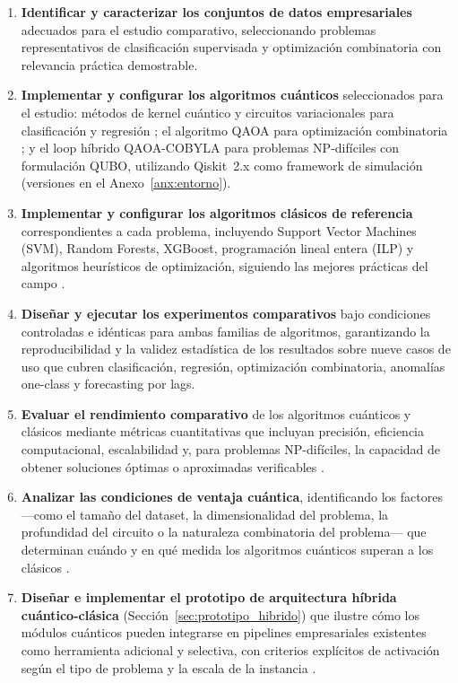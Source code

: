 \begin{enumerate}
    \item \textbf{Identificar y caracterizar los conjuntos de datos empresariales} adecuados para el estudio comparativo, seleccionando problemas representativos de clasificación supervisada y optimización combinatoria con relevancia práctica demostrable.

    \item \textbf{Implementar y configurar los algoritmos cuánticos} seleccionados para el estudio: métodos de kernel cuántico y circuitos variacionales para clasificación y regresión \citep{schuld2021, huang2021}; el algoritmo QAOA para optimización combinatoria \citep{farhi2014}; y el loop híbrido QAOA-COBYLA para problemas NP-difíciles con formulación QUBO, utilizando Qiskit~2.x como framework de simulación (versiones en el Anexo~\ref{anx:entorno}).

    \item \textbf{Implementar y configurar los algoritmos clásicos de referencia} correspondientes a cada problema, incluyendo Support Vector Machines (SVM), Random Forests, XGBoost, programación lineal entera (ILP) y algoritmos heurísticos de optimización, siguiendo las mejores prácticas del campo \citep{jordan2015}.

    \item \textbf{Diseñar y ejecutar los experimentos comparativos} bajo condiciones controladas e idénticas para ambas familias de algoritmos, garantizando la reproducibilidad y la validez estadística de los resultados sobre nueve casos de uso que cubren clasificación, regresión, optimización combinatoria, anomalías one-class y forecasting por lags.

    \item \textbf{Evaluar el rendimiento comparativo} de los algoritmos cuánticos y clásicos mediante métricas cuantitativas que incluyan precisión, eficiencia computacional, escalabilidad y, para problemas NP-difíciles, la capacidad de obtener soluciones óptimas o aproximadas verificables \citep{cerezo2021, zhou2020}.

    \item \textbf{Analizar las condiciones de ventaja cuántica}, identificando los factores ---como el tamaño del dataset, la dimensionalidad del problema, la profundidad del circuito o la naturaleza combinatoria del problema--- que determinan cuándo y en qué medida los algoritmos cuánticos superan a los clásicos \citep{huang2021, cerezo2023}.

    \item \textbf{Diseñar e implementar el prototipo de arquitectura híbrida cuántico-clásica} (Sección~\ref{sec:prototipo_hibrido}) que ilustre cómo los módulos cuánticos pueden integrarse en pipelines empresariales existentes como herramienta adicional y selectiva, con criterios explícitos de activación según el tipo de problema y la escala de la instancia \citep{cerezo2021}.


\end{enumerate}
